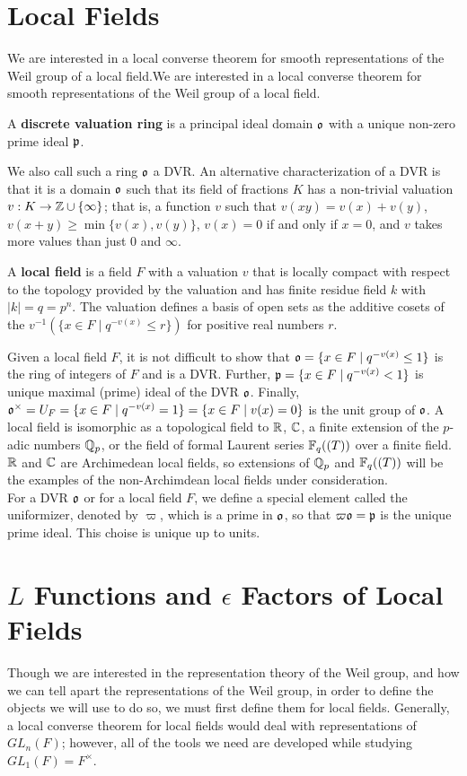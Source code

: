 \section{Local Fields}
\label{sec:local-fields}
We are interested in a local converse theorem for smooth representations of the Weil group of a local field.We are interested in a local converse theorem for smooth representations of the Weil group of a local field.
\begin{defn}
  A \textbf{discrete valuation ring} is a principal ideal domain $\mathfrak{o}$ with a unique non-zero prime ideal $\mathfrak{p}$.
\end{defn}
We also call such a ring $\mathfrak{o}$ a DVR.
An alternative characterization of a DVR is that it is a domain $\mathfrak{o}$ such that its field of fractions $K$ has a non-trivial valuation $v : K \to \mathbb{Z} \cup \{ \infty \}$; that is, a function $v$ such that $v(xy) = v(x) + v(y)$, $v(x+y) \geq \min \{v(x),v(y)\}$, $v(x) = 0$ if and only if $x = 0$, and $v$ takes more values than just $0$ and $\infty$.
\begin{defn}
  A \textbf{local field} is a field $F$ with a valuation $v$ that is locally compact with respect to the topology provided by the valuation and has finite residue field $k$ with $|k| = q = p^n$.
  The valuation defines a basis of open sets as the additive cosets of the $v^{-1}(\{x \in F \mid q^{-v(x)} \leq r\})$ for positive real numbers $r$.
\end{defn}
Given a local field $F$, it is not difficult to show that $\mathfrak{o} = \{x \in F \mid q^{-v(x)} \leq 1\}$ is the ring of integers of $F$ and is a DVR.
Further, $\mathfrak{p} = \{x \in F \mid q^{-v(x)} < 1\}$ is unique maximal (prime) ideal of the DVR $\mathfrak{o}$.
Finally, $\mathfrak{o}^\times = U_F = \{x \in F \mid q^{-v(x)} = 1\} = \{x \in F \mid v(x) = 0\}$ is the unit group of $\mathfrak{o}$.
A local field is isomorphic as a topological field to $\mathbb{R}$, $\mathbb{C}$, a finite extension of the $p$-adic numbers $\mathbb{Q}_p$, or the field of formal Laurent series $\mathbb{F}_q((T))$ over a finite field.
$\mathbb{R}$ and $\mathbb{C}$ are Archimedean local fields, so extensions of $\mathbb{Q}_p$ and $\mathbb{F}_q((T))$ will be the examples of the non-Archimdean local fields under consideration.
\\

For a DVR $\mathfrak{o}$ or for a local field $F$, we define a special element called the uniformizer, denoted by $\varpi$, which is a prime in $\mathfrak{o}$, so that $\varpi \mathfrak{o} = \mathfrak{p}$ is the unique prime ideal.
This choise is unique up to units.

\section{$L$ Functions and $\epsilon$ Factors of Local Fields}
\label{sec:Leps-LF}
Though we are interested in the representation theory of the Weil group, and how we can tell apart the representations of the Weil group, in order to define the objects we will use to do so, we must first define them for local fields.
Generally, a local converse theorem for local fields would deal with representations of $GL_n(F)$; however, all of the tools we need are developed while studying $GL_1(F) = F^\times$.\\


